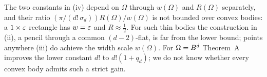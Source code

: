 \begin{remark}
The two constants in (iv) depend on $\Omega$ through $w(\Omega)$ and $R(\Omega)$ separately, and their ratio
$(\pi/(d!\,\sigma_d))R(\Omega)/w(\Omega)$ is not bounded over convex bodies: a $1\times\varepsilon$ rectangle has
$w=\varepsilon$ and $R\approx\frac12$. For such thin bodies the construction in (ii), a pencil through a common
$(d-2)$-flat, is far from the lower bound; points anywhere (iii) do achieve the width scale $w(\Omega)$. For
$\Omega=B^d$ Theorem~A improves the lower constant $d!$ to $d!(1+q_d)$; we do not know whether every
convex body admits such a strict gain.
\end{remark}
